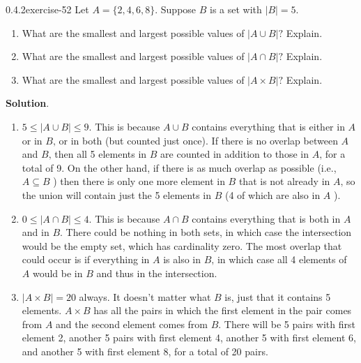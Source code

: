 \documentclass[twoside,11pt,]{book}
\numberwithin{equation}{chapter}
\begin{document}
\begin{divisionsolution}{0.4.2}{}{exercise-52}%
\hypertarget{p-901}{}%
Let \(A = \{2, 4, 6, 8\}\text{.}\) Suppose \(B\) is a set with \(|B| = 5\text{.}\)\leavevmode%
\begin{enumerate}[label=(\alph*)]
\item\hypertarget{li-727}{}\hypertarget{p-902}{}%
What are the smallest and largest possible values of \(|A \cup B|\text{?}\) Explain.%
\item\hypertarget{li-728}{}\hypertarget{p-903}{}%
What are the smallest and largest possible values of \(|A \cap B|\text{?}\) Explain.%
\item\hypertarget{li-729}{}\hypertarget{p-904}{}%
What are the smallest and largest possible values of \(|A \times B|\text{?}\) Explain.%
\end{enumerate}
%
\par\smallskip%
\noindent\textbf{Solution}.\quad%
\hypertarget{p-905}{}%
\leavevmode%
\begin{enumerate}[label=(\alph*)]
\item\hypertarget{li-730}{}\hypertarget{p-906}{}%
\(5 \le |A\cup B| \le 9\text{.}\) This is because \(A \cup B\) contains everything that is either in \(A\) or in \(B\text{,}\) or in both (but counted just once). If there is no overlap between \(A\) and \(B\text{,}\) then all 5 elements in \(B\) are counted in addition to those in \(A\text{,}\) for a total of 9. On the other hand, if there is as much overlap as possible (i.e., \(A \subseteq B\) ) then there is only one more element in \(B\) that is not already in \(A\text{,}\) so the union will contain just the 5 elements in \(B\) (4 of which are also in \(A\) ).%
\item\hypertarget{li-731}{}\hypertarget{p-907}{}%
\(0 \le |A \cap B| \le 4\text{.}\) This is because \(A \cap B\) contains everything that is both in \(A\) and in \(B\text{.}\) There could be nothing in both sets, in which case the intersection would be the empty set, which has cardinality zero. The most overlap that could occur is if everything in \(A\) is also in \(B\text{,}\) in which case all 4 elements of \(A\) would be in \(B\) and thus in the intersection.%
\item\hypertarget{li-732}{}\hypertarget{p-908}{}%
\(|A \times B| = 20\) always. It doesn't matter what \(B\) is, just that it contains 5 elements. \(A \times B\) has all the pairs in which the first element in the pair comes from \(A\) and the second element comes from \(B\text{.}\) There will be 5 pairs with first element 2, another 5 pairs with first element 4, another 5 with first element 6, and another 5 with first element 8, for a total of 20 pairs.%
\end{enumerate}
%
\end{divisionsolution}%
\end{document}
